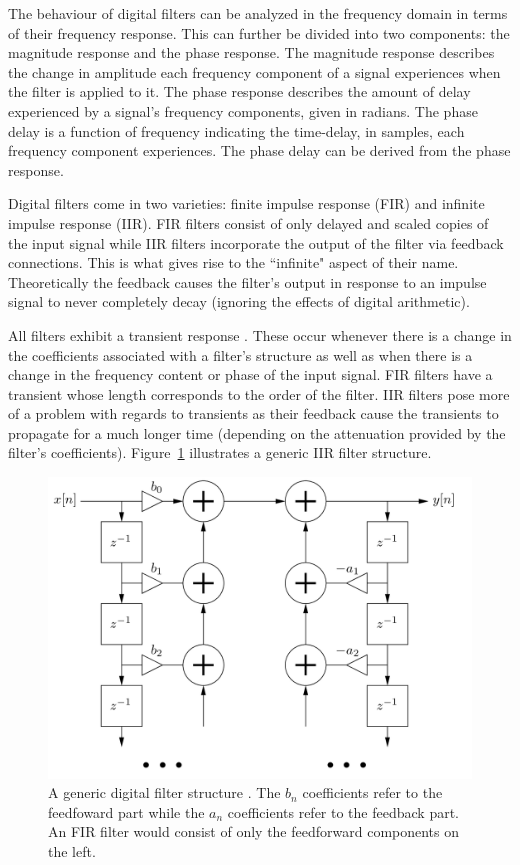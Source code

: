 \documentclass[main.tex]{subfiles}
\begin{document}
The behaviour of digital filters can be analyzed in the frequency domain in terms of their frequency response. This can further be divided into two components: the magnitude response and the phase response. The magnitude response describes the change in amplitude each frequency component of a signal experiences when the filter is applied to it. The phase response describes the amount of delay experienced by a signal's frequency components, given in radians. The phase delay is a function of frequency indicating the time-delay, in samples, each frequency component experiences. The phase delay can be derived from the phase response.

Digital filters come in two varieties: finite impulse response (FIR) and infinite impulse response (IIR). FIR filters consist of only delayed and scaled copies of the input signal while IIR filters incorporate the output of the filter via feedback connections. This is what gives rise to the ``infinite" aspect of their name. Theoretically the feedback causes the filter's output in response to an impulse signal to never completely decay (ignoring the effects of digital arithmetic).

All filters exhibit a transient response . These occur whenever there is a change in the coefficients associated with a filter's structure as well as when there is a change in the frequency content or phase of the input signal. FIR filters have a transient whose length corresponds to the order of the filter. IIR filters pose more of a problem with regards to transients as their feedback cause the transients to propagate for a much longer time (depending on the attenuation provided by the filter's coefficients). Figure~\ref{fig:generic_IIR} illustrates a generic IIR filter structure.

\begin{figure}[h!]
    \centering
    \includegraphics[scale=.30]{./images/diagrams/digitalFilter.png}
    \caption{A generic digital filter structure . The $b_n$ coefficients refer to the feedfoward part while the $a_n$ coefficients refer to the feedback part. An FIR filter would consist of only the feedforward components on the left.}
    \label{fig:generic_IIR}
\end{figure}
\end{document}
